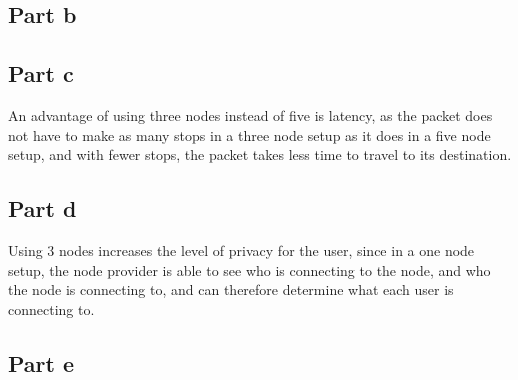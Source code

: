 \documentclass[12pt,a4paper]{article}
\begin{document}
\subsection{Part b}


\subsection{Part c}
An advantage of using three nodes instead of five is latency, as the packet does not have to make as many stops in a three node setup as it does in a five node setup, and with fewer stops, the packet takes less time to travel to its destination.

\subsection{Part d}
Using 3 nodes increases the level of privacy for the user, since in a one node setup, the node provider is able to see who is connecting to the node, and who the node is connecting to, and can therefore determine what each user is connecting to.

\subsection{Part e}
\end{document}
